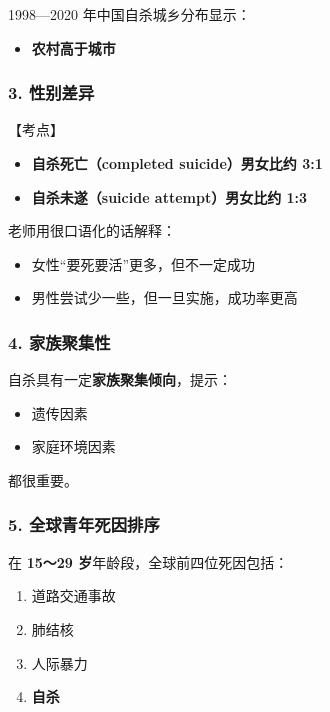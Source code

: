 \documentclass[
  chinese,
  9pt,
  a4paper,
]{ctexart}
\providecommand{\tightlist}{%
  \setlength{\itemsep}{0pt}\setlength{\parskip}{0pt}}
\begin{document}
1998---2020 年中国自杀城乡分布显示：

\begin{itemize}
\tightlist
\item
  \textbf{农村高于城市}
\end{itemize}

\subsubsection{3. 性别差异}\label{ux6027ux522bux5deeux5f02-1}

【考点】

\begin{itemize}
\tightlist
\item
  \textbf{自杀死亡（completed suicide）男女比约 3:1}
\item
  \textbf{自杀未遂（suicide attempt）男女比约 1:3}
\end{itemize}

老师用很口语化的话解释：

\begin{itemize}
\tightlist
\item
  女性``要死要活''更多，但不一定成功
\item
  男性尝试少一些，但一旦实施，成功率更高
\end{itemize}

\subsubsection{4. 家族聚集性}\label{ux5bb6ux65cfux805aux96c6ux6027}

自杀具有一定\textbf{家族聚集倾向}，提示：

\begin{itemize}
\tightlist
\item
  遗传因素
\item
  家庭环境因素
\end{itemize}

都很重要。

\subsubsection{5.
全球青年死因排序}\label{ux5168ux7403ux9752ux5e74ux6b7bux56e0ux6392ux5e8f}

在 \textbf{15～29 岁}年龄段，全球前四位死因包括：

\begin{enumerate}
\def\labelenumi{\arabic{enumi}.}
\tightlist
\item
  道路交通事故
\item
  肺结核
\item
  人际暴力
\item
  \textbf{自杀}
\end{enumerate}
\end{document}
